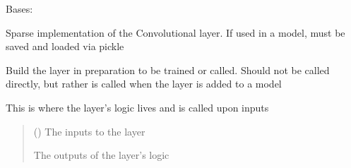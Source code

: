 \documentclass[letterpaper,10pt,english]{sphinxmanual}
\begin{document}
\begin{fulllineitems}
\label{\detokenize{beyondml.tflow.layers:beyondml.tflow.layers.SparseConv3D.SparseConv3D}}
\pysigstartsignatures
{}
\pysigstopsignatures
\sphinxAtStartPar
Bases: 

\sphinxAtStartPar
Sparse implementation of the Convolutional layer. If used in a model,
must be saved and loaded via pickle

\begin{fulllineitems}
\label{\detokenize{beyondml.tflow.layers:beyondml.tflow.layers.SparseConv3D.SparseConv3D.build}}
\pysigstartsignatures
{}
\pysigstopsignatures
\sphinxAtStartPar
Build the layer in preparation to be trained or called. Should not be called directly,
but rather is called when the layer is added to a model

\end{fulllineitems}


\begin{fulllineitems}
\label{\detokenize{beyondml.tflow.layers:beyondml.tflow.layers.SparseConv3D.SparseConv3D.call}}
\pysigstartsignatures
{}
\pysigstopsignatures
\sphinxAtStartPar
This is where the layer’s logic lives and is called upon inputs
\begin{quote}\begin{description}
\sphinxAtStartPar
{} () \textendash{} The inputs to the layer

\sphinxAtStartPar
{} \textendash{} The outputs of the layer’s logic


\end{description}
\end{quote}
\end{fulllineitems}
\end{fulllineitems}
\end{document}
